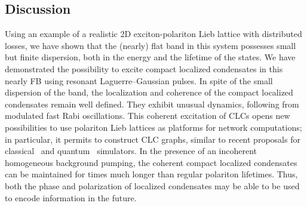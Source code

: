 %
%
\subsection{Discussion}
Using an example of a realistic 2D exciton-polariton Lieb lattice with distributed losses, we have shown that the (nearly) flat band in this system possesses small but finite dispersion, both in the energy and the lifetime of the states.
We have demonstrated the possibility to excite compact localized condensates in this nearly FB using resonant Laguerre--Gaussian pulses.
In spite of the small dispersion of the band, the localization and coherence of the compact localized condensates remain well defined.
They exhibit unusual dynamics, following from modulated fast Rabi oscillations.
This coherent excitation of CLCs opens new possibilities to use polariton Lieb lattices as platforms for network computations; in particular, it permits to construct CLC graphs, similar to recent proposals for classical~\cite{Berloff:2017aa,Ohadi:2017aa} and quantum~\cite{Liew:2018aa} simulators.
In the presence of an incoherent homogeneous background pumping, the coherent compact localized condensates can be maintained for times much longer than regular polariton lifetimes.
Thus, both the phase and polarization of localized condensates may be able to be used to encode information in the future.
